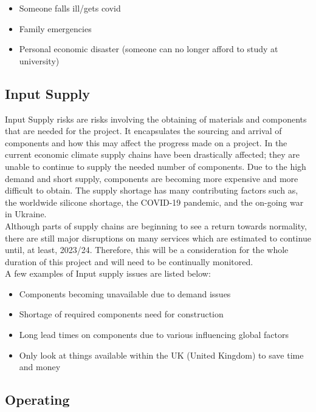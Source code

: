 \documentclass [12pt]{article}
\begin{document}
\begin{itemize}
    \item Someone falls ill/gets covid
    \item Family emergencies
    \item Personal economic disaster (someone can no longer afford to study at university)
\end{itemize}

\subsection{Input Supply}\label{sec:Input_Supply_Risk}

Input Supply risks are risks involving the obtaining of materials and components that are needed for the project. It encapsulates the sourcing and arrival of components and how this may affect the progress made on a project. In the current economic climate supply chains have been drastically affected; they are unable to continue to supply the needed number of components. Due to the high demand and short supply, components are becoming more expensive and more difficult to obtain. The supply shortage has many contributing factors such as, the worldwide silicone shortage, the COVID-19 pandemic, and the on-going war in Ukraine.
\\
Although parts of supply chains are beginning to see a return towards normality, there are still major disruptions on many services which are estimated to continue until, at least, 2023/24. Therefore, this will be a consideration for the whole duration of this project and will need to be continually monitored.
\\
A few examples of Input supply issues are listed below:

\begin{itemize}
    \item Components becoming unavailable due to demand issues
    \item Shortage of required components need for construction
    \item Long lead times on components due to various influencing global factors
    \item Only look at things available within the UK (United Kingdom) to save time and money
\end{itemize}

\subsection{Operating}\label{sec:Operating_Risk}
\end{document}
